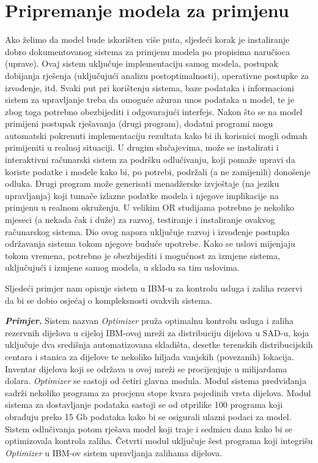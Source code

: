 \documentclass[a4paper, utf8, 11pt, colorlinks]{book}
\begin{document}
\section{Pripremanje modela za primjenu}
Ako želimo da model bude iskorišten više puta, sljedeći  korak je instaliranje dobro dokumentovanog sistema za primjenu modela po propisima naručioca (uprave). Ovaj sistem uključuje implementaciju samog modela, postupak dobijanja rješenja (uključujući analizu postoptimalnosti), operativne postupke za izvođenje, itd. %
Svaki put pri korištenju sistema, baze podataka i informacioni sistem za upravljanje treba da omoguće ažuran unos podataka u model, te je zbog toga potrebno obezbijediti i odgovarajući interfejs. Nakon što se na model primijeni postupak rješavanja (drugi program), dodatni  programi mogu automatski pokrenuti implementaciju rezultata kako bi ih korisnici mogli odmah primijeniti u realnoj situaciji. U drugim slučajevima, može se instalirati i interaktivni računarski sistem  za podršku odlučivanju, koji pomaže upravi da koriste podatke i modele kako bi, po potrebi, podržali (a ne zamijenili)   donošenje odluka. Drugi program može generisati menadžerske izvještaje (na jeziku upravljanja) koji tumače izlazne podatke modela i njegove implikacije na primjenu u realnom okruženju.  U velikim OR studijama potrebno je nekoliko mjeseci (a nekada čak i duže) za razvoj, testiranje i instaliranje ovakvog računarskog sistema. Dio ovog napora uključuje razvoj i izvođenje postupka održavanja sistema  tokom njegove buduće upotrebe. Kako se uslovi mijenjaju tokom vremena, potrebno je obezbijediti i mogućnost za  izmjene sistema, uključujući i izmjene samog modela, u skladu sa tim uslovima.  

Sljedeći primjer nam opisuje sistem u IBM-u za kontrolu usluga i zaliha rezervi da bi se dobio osjećaj o kompleksnosti ovakvih sistema.  

\textbf{\emph{Primjer.}}
Sistem nazvan \emph{Optimizer} pruža optimalnu kontrolu usluga i zaliha rezervnih dijelova u cijeloj IBM-ovoj mreži za distribuciju dijelova u SAD-u, koja uključuje dva središnja
automatizovana skladišta, desetke terenskih distribucijskih centara i stanica za dijelove te nekoliko hiljada vanjskih (povezanih) lokacija. Inventar dijelova koji se održava u ovoj mreži se procijenjuje u milijardama dolara. \emph{Optimizer} se sastoji od četiri glavna modula. Modul sistema predviđanja sadrži nekoliko programa za procjenu stope kvara pojedinih vrsta dijelova. Modul sistema za dostavljanje podataka sastoji se od otprilike 100 programa koji    obrađuju
preko 15 Gb podataka kako bi se osigurali ulazni podaci za model. Sistem odlučivanja potom rješava model koji traje i  sedmicu dana kako bi se optimizovala kontrola zaliha. Četvrti modul uključuje šest programa koji integrišu \emph{Optimizer} u IBM-ov sistem upravljanja zalihama dijelova. %
\end{document}
